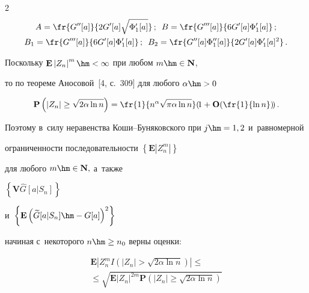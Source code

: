 \begin{multicols}{2}
\begin{gather*}
  A = \fr{G''[a]}{2 G'[a]\sqrt {\Phi'_1[a]} }\,;\enskip


 B = \fr{G'''[a]}{6 G'[a]\Phi'_1[a]}\,;


 \label{e14-ch}\\


B_1  = \fr{G'''[a]}{6 G'[a]\Phi '_1[a]}\,;\enskip


 B_2  = \fr{G''[a]\Phi ''_1 [a]}{2 G'[a]\Phi'_1[a]^2 }\,.




 \end{gather*}





 Поскольку $\mathbf{E}\left|Z_n\right|^m\hm<\infty$ при любом $m\hm\in \mathbf{N}$,


 то по теореме Аносовой~[4, с.~309] для любого $\alpha\hm>0$


 \begin{equation*}


 \mathbf{P}\left( \left| {Z_n } \right| \ge \sqrt {2\alpha \ln n} \right)


 = \fr{1}{n^\alpha \sqrt{\pi\alpha\ln n}}


\! \left(\!1+\mathbf{O}\!\left( \fr{1}{\ln n} \right)\!\right).


 \end{equation*}


 Поэтому в~силу неравенства Ко\-ши--Бу\-ня\-ков\-ско\-го при $j\hm=1,2$ и~равномерной 


 ограниченности последовательности $\left\{\mathbf{E} |Z_n^m|\right\}$


 для любого $m\hm\in \mathbf{N},$ а~также


 $\left\{\mathbf{V} \widehat{G}[a|S_n]\right\}$ 


 и~$\left\{\mathbf{E} \left(\widetilde{G}[a|S_n]\hm-G[a]\right)^2\right\}$


 начиная с~некоторого $n\hm\ge n_0$ верны оценки:


 \begin{multline}


 \mathbf{E}\left| Z_n^m  I\left( \left| {Z_n } \right| > 


 \sqrt {2\alpha \ln n} \right)\right|\le{}


 \\ 


 \le \sqrt{\mathbf{E}\left|Z_n\right|^{2m}


 \mathbf{P}\left( \left| {Z_n } \right| \ge \sqrt {2\alpha \ln n} \right)}



\end{multline}
\end{multicols}
